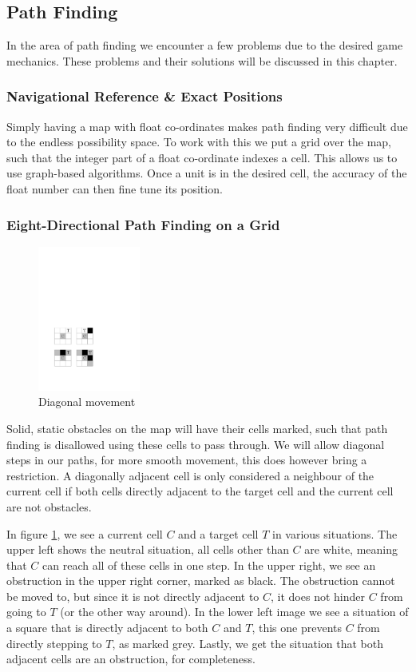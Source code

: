 \subsection{Path Finding}
In the area of path finding we encounter a few problems due to the desired game mechanics. These problems and their solutions will be discussed in this chapter.

\subsubsection{Navigational Reference \& Exact Positions}
Simply having a map with float co-ordinates makes path finding very difficult due to the endless possibility space. To work with this we put a grid over the map, such that the integer part of a float co-ordinate indexes a cell. This allows us to use graph-based algorithms. Once a unit is in the desired cell, the accuracy of the float number can then fine tune its position.

\subsubsection{Eight-Directional Path Finding on a Grid}
\begin{figure}
\includegraphics[width=0.30\textwidth]{images/diagonal_moves.pdf}
\caption{Diagonal movement}
\label{fig:diag_move}
\end{figure}

Solid, static obstacles on the map will have their cells marked, such that path finding is disallowed using these cells to pass through. We will allow diagonal steps in our paths, for more smooth movement, this does however bring a restriction. A diagonally adjacent cell is only considered a neighbour of the current cell if both cells directly adjacent to the target cell and the current cell are not obstacles. 

In figure \ref{fig:diag_move}, we see a current cell $C$ and a target cell $T$ in various situations. The upper left shows the neutral situation, all cells other than $C$ are white, meaning that $C$ can reach all of these cells in one step. In the upper right, we see an obstruction in the upper right corner, marked as black. The obstruction cannot be moved to, but since it is not directly adjacent to $C$, it does not hinder $C$ from going to $T$ (or the other way around). In the lower left image we see a situation of a square that is directly adjacent to both $C$ and $T$, this one prevents $C$ from directly stepping to $T$, as marked grey. Lastly, we get the situation that both adjacent cells are an obstruction, for completeness.

